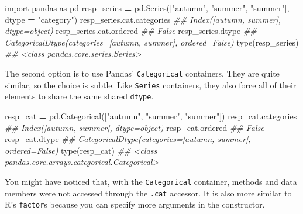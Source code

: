 \documentclass[
  12pt,
]{krantz}
\makeatletter
\newenvironment{Shaded}{\begin{snugshade}}{\end{snugshade}}
\newcommand{\BuiltInTok}[1]{#1}
\newcommand{\CommentTok}[1]{\textcolor[rgb]{0.37,0.37,0.37}{\textit{#1}}}
\newcommand{\ImportTok}[1]{#1}
\newcommand{\NormalTok}[1]{#1}
\newcommand{\OperatorTok}[1]{\textcolor[rgb]{0.43,0.43,0.43}{\textbf{#1}}}
\newcommand{\StringTok}[1]{\textcolor[rgb]{0.5,0.5,0.5}{#1}}
\newenvironment{kframe}{%
\medskip{}
\setlength{\fboxsep}{.8em}
 \def\at@end@of@kframe{}%
 \ifinner\ifhmode%
  \def\at@end@of@kframe{\end{minipage}}%
  \begin{minipage}{\columnwidth}%
 \fi\fi%
 \def\FrameCommand##1{\hskip\@totalleftmargin \hskip-\fboxsep
 \colorbox{shadecolor}{##1}\hskip-\fboxsep
     \hskip-\linewidth \hskip-\@totalleftmargin \hskip\columnwidth}%
 \MakeFramed {\advance\hsize-\width
   \@totalleftmargin\z@ \linewidth\hsize
   \@setminipage}}%
 {\par\unskip\endMakeFramed%
 \at@end@of@kframe}
\renewenvironment{Shaded}{\begin{kframe}}{\end{kframe}}
\makeatother
\begin{document}
\begin{Shaded}
\begin{Highlighting}[]
\ImportTok{import}\NormalTok{ pandas }\ImportTok{as}\NormalTok{ pd}
\NormalTok{resp\_series }\OperatorTok{=}\NormalTok{ pd.Series([}\StringTok{"autumn"}\NormalTok{, }\StringTok{"summer"}\NormalTok{, }\StringTok{"summer"}\NormalTok{], dtype }\OperatorTok{=} \StringTok{"category"}\NormalTok{) }
\NormalTok{resp\_series.cat.categories}
\CommentTok{\#\# Index([\textquotesingle{}autumn\textquotesingle{}, \textquotesingle{}summer\textquotesingle{}], dtype=\textquotesingle{}object\textquotesingle{})}
\NormalTok{resp\_series.cat.ordered}
\CommentTok{\#\# False}
\NormalTok{resp\_series.dtype}
\CommentTok{\#\# CategoricalDtype(categories=[\textquotesingle{}autumn\textquotesingle{}, \textquotesingle{}summer\textquotesingle{}], ordered=False)}
\BuiltInTok{type}\NormalTok{(resp\_series)}
\CommentTok{\#\# \textless{}class \textquotesingle{}pandas.core.series.Series\textquotesingle{}\textgreater{}}
\end{Highlighting}
\end{Shaded}

The second option is to use Pandas' \texttt{Categorical} containers. They are quite similar, so the choice is subtle. Like \texttt{Series} containers, they also force all of their elements to share the same shared \texttt{dtype}.

\begin{Shaded}
\begin{Highlighting}[]
\NormalTok{resp\_cat }\OperatorTok{=}\NormalTok{ pd.Categorical([}\StringTok{"autumn"}\NormalTok{, }\StringTok{"summer"}\NormalTok{, }\StringTok{"summer"}\NormalTok{])}
\NormalTok{resp\_cat.categories}
\CommentTok{\#\# Index([\textquotesingle{}autumn\textquotesingle{}, \textquotesingle{}summer\textquotesingle{}], dtype=\textquotesingle{}object\textquotesingle{})}
\NormalTok{resp\_cat.ordered}
\CommentTok{\#\# False}
\NormalTok{resp\_cat.dtype}
\CommentTok{\#\# CategoricalDtype(categories=[\textquotesingle{}autumn\textquotesingle{}, \textquotesingle{}summer\textquotesingle{}], ordered=False)}
\BuiltInTok{type}\NormalTok{(resp\_cat)}
\CommentTok{\#\# \textless{}class \textquotesingle{}pandas.core.arrays.categorical.Categorical\textquotesingle{}\textgreater{}}
\end{Highlighting}
\end{Shaded}

You might have noticed that, with the \texttt{Categorical} container, methods and data members were not accessed through the \texttt{.cat} accessor. It is also more similar to R's \texttt{factor}s because you can specify more arguments in the constructor.
\end{document}
